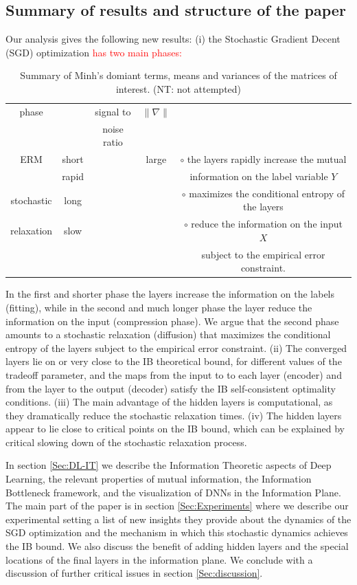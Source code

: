 \documentclass[11pt]{article}
\begin{document}
\subsection{Summary of results and structure of the paper}
Our analysis gives the following new results: (i) the Stochastic Gradient Decent (SGD) optimization
\textcolor{red}{has two main phases:}
\begin{table}
	\caption{Summary of Minh's domiant terms, means and variances of the matrices of interest. (NT: not attempted)}
	\begin{center}
		\begin{tabular}{|c|c|c|c|c|} \hline
		phase &	&signal to & $\| \nabla \|$&  \\ 
		&&noise ratio&&  \\ \hline
ERM&short &&large& $\circ$ the layers rapidly increase the mutual   \\ 
&rapid&&&information on the label variable $Y$\\  \hline 
stochastic &long &&&$\circ$ maximizes the conditional entropy of the layers  \\ 
relaxation&slow&&&$\circ$  reduce the information on the input $X$ \\ 
&&&& subject to the empirical error constraint. \\ \hline
		\end{tabular}
	\end{center}
\end{table}
 In the first and shorter phase the layers increase the information on the labels (fitting), 
while in the second and much longer phase the layer reduce the information on the input (compression phase). 
We argue that the second phase amounts to a stochastic relaxation (diffusion) that maximizes the conditional entropy of the layers subject to the empirical error constraint.  (ii) The converged layers lie on or very close to the IB theoretical bound, for different values of the tradeoff parameter, and the maps from the input to to each layer (encoder) and from the layer to the output (decoder) satisfy the IB self-consistent optimality conditions. (iii) The main advantage of the hidden layers is computational, as they dramatically reduce the stochastic relaxation times. (iv) The hidden layers appear to lie close to critical points on the IB bound, which can be explained by critical slowing down of the stochastic relaxation process. 

In section \ref{Sec:DL-IT} we describe the Information Theoretic aspects of Deep Learning, the relevant properties of mutual information, the Information Bottleneck framework, and the visualization of DNNs in the Information Plane. The main part of the paper is in section \ref{Sec:Experiments} where we describe our experimental setting a list of new insights they provide about the dynamics of the SGD optimization and the mechanism in which this stochastic dynamics achieves the IB bound. We also discuss the benefit of adding hidden layers and the special locations of the final layers in the information plane. We conclude with a discussion of further critical issues in section \ref{Sec:discussion}.  
\end{document}
